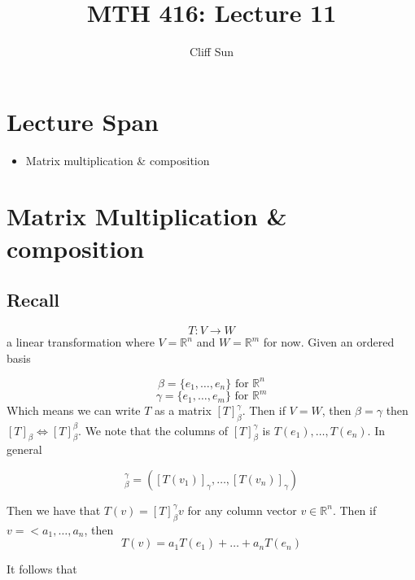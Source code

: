 \documentclass{article}
\title{MTH 416: Lecture 11}
\author{Cliff Sun}
\newtheorem{one minute paper}[theorem]{One Minute Paper}
\begin{document}
\maketitle

\section*{Lecture Span}
\begin{itemize}
    \item Matrix multiplication \& composition
\end{itemize}

\section*{Matrix Multiplication \& composition}

\subsection*{Recall}

\begin{equation}
    T: V \rightarrow W
\end{equation}
a linear transformation where $V = \mathbb{R}^n$ and $W = \mathbb{R}^m$ for now. Given an ordered basis 

\begin{equation}
    \beta = \{e_1, \dots, e_n\} \text{ for } \mathbb{R}^n
\end{equation}
\begin{equation}
    \gamma = \{e_1, \dots, e_m\} \text{ for } \mathbb{R}^m
\end{equation}
Which means we can write $T$ as a matrix $[T]_\beta^\gamma$. Then if $V = W$, then $\beta = \gamma$ then $[T]_\beta \iff [T]_\beta^\beta$. We note that 
the columns of $[T]_\beta^\gamma$ is $T(e_1), \dots, T(e_n)$. In general

\begin{equation}
    [T]_\beta^\gamma = \left([T(v_1)]_\gamma, \dots, [T(v_n)]_\gamma\right)
\end{equation}

Then we have that $T(v) = [T]_\beta^\gamma v$ for any column vector $v \in \mathbb{R}^n$. Then if $v = <a_1, \dots, a_n$, then 
\begin{equation}
    T(v) = a_1T(e_1) + \dots + a_nT(e_n)
\end{equation}

It follows that 
\end{document}
